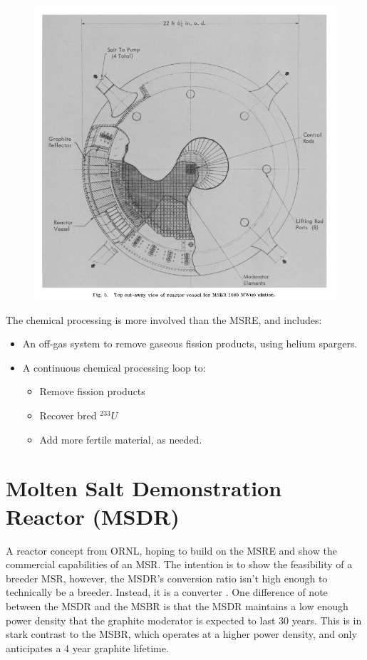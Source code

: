 \documentclass[letterpaper]{article}
\begin{document}
\begin{figure}[H]
  \centering
  \includegraphics[width=1.0\linewidth]{figures/MSBRsource2.png}
  \label{fig:fig4}
\end{figure}

The chemical processing is more involved than the MSRE, and includes:
\begin{itemize}
\item An off-gas system to remove gaseous fission products, using helium spargers.
\item A continuous chemical processing loop to:
	\begin{itemize}
	\item Remove fission products
	\item Recover bred ${}^{233}U$
	\item Add more fertile material, as needed.
	\end{itemize}
\end{itemize}

\section{Molten Salt Demonstration Reactor (MSDR)}
A reactor concept from ORNL, hoping to build on the MSRE and show the commercial capabilities of an MSR.  The intention is to show the feasibility of a breeder MSR, however, the MSDR's conversion ratio isn't high enough to technically be a breeder.  Instead, it is a converter \cite{bettis_design_1972}.  One difference of note between the MSDR and the MSBR is that the  MSDR maintains a low enough power density that the graphite moderator is expected to last 30 years.  This is in stark contrast to the MSBR, which operates at a higher power density, and only anticipates a 4 year graphite lifetime.
\end{document}
